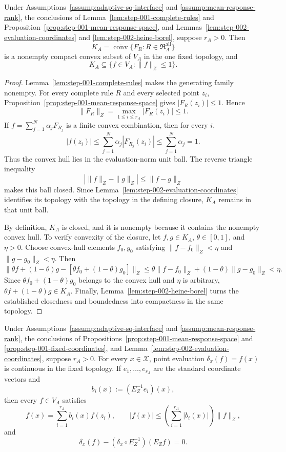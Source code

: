 \begin{proposition}
\label{prop:step-002-compact-body}
Under Assumptions~\ref{assump:adaptive-sq-interface} and
\ref{assump:mean-response-rank}, the conclusions of
Lemma~\ref{lem:step-001-complete-rules} and
Proposition~\ref{prop:step-001-mean-response-space}, and
Lemmas~\ref{lem:step-002-evaluation-coordinates} and
\ref{lem:step-002-heine-borel}, suppose \(r_A>0\).  Then
\[
K_A=\overline{\operatorname{conv}}
\{F_R:R\in\mathfrak R_A^{\mathrm{all}}\}
\]
is a nonempty compact convex subset of \(V_A\) in the one fixed topology, and
\[
K_A\subseteq\{f\in V_A:\|f\|_Z\le1\}.
\]
\end{proposition}

\begin{proof}
Lemma~\ref{lem:step-001-complete-rules} makes the generating family nonempty.
For every complete rule \(R\) and every selected point \(z_i\),
Proposition~\ref{prop:step-001-mean-response-space} gives
\(|F_R(z_i)|\le1\).  Hence
\[
\|F_R\|_Z=\max_{1\le i\le r_A}|F_R(z_i)|\le1.
\]
If \(f=\sum_{j=1}^N\alpha_jF_{R_j}\) is a finite convex combination, then
for every \(i\),
\[
|f(z_i)|
\le\sum_{j=1}^N\alpha_j|F_{R_j}(z_i)|
\le\sum_{j=1}^N\alpha_j=1.
\]
Thus the convex hull lies in the evaluation-norm unit ball.  The reverse
triangle inequality
\[
|\|f\|_Z-\|g\|_Z|\le\|f-g\|_Z
\]
makes this ball closed.  Since
Lemma~\ref{lem:step-002-evaluation-coordinates} identifies its topology with
the topology in the defining closure, \(K_A\) remains in that unit ball.

By definition, \(K_A\) is closed, and it is nonempty because it contains the
nonempty convex hull.  To verify convexity of the closure, let
\(f,g\in K_A\), \(\theta\in[0,1]\), and \(\eta>0\).  Choose convex-hull
elements \(f_0,g_0\) satisfying
\(\|f-f_0\|_Z<\eta\) and \(\|g-g_0\|_Z<\eta\).  Then
\[
\|\theta f+(1-\theta)g-[\theta f_0+(1-\theta)g_0]\|_Z
\le\theta\|f-f_0\|_Z+(1-\theta)\|g-g_0\|_Z
<\eta.
\]
Since \(\theta f_0+(1-\theta)g_0\) belongs to the convex hull and
\(\eta\) is arbitrary, \(\theta f+(1-\theta)g\in K_A\).  Finally,
Lemma~\ref{lem:step-002-heine-borel} turns the established closedness and
boundedness into compactness in the same topology.
\end{proof}

\begin{lemma}
\label{lem:step-002-continuous-evaluations}
Under Assumptions~\ref{assump:adaptive-sq-interface} and
\ref{assump:mean-response-rank}, the conclusions of
Propositions~\ref{prop:step-001-mean-response-space} and
\ref{prop:step-001-fixed-coordinates}, and
Lemma~\ref{lem:step-002-evaluation-coordinates}, suppose \(r_A>0\).  For
every \(x\in\mathcal X\), point evaluation \(\delta_x(f)=f(x)\) is
continuous in the fixed topology.  If \(e_1,\ldots,e_{r_A}\) are the
standard coordinate vectors and
\[
b_i(x):=(E_Z^{-1}e_i)(x),
\]
then every \(f\in V_A\) satisfies
\[
f(x)=\sum_{i=1}^{r_A}b_i(x)f(z_i),
\qquad
|f(x)|\le\left(\sum_{i=1}^{r_A}|b_i(x)|\right)\|f\|_Z,
\]
and
\[
\delta_x(f)-(\delta_x\circ E_Z^{-1})(E_Zf)=0.
\]
\end{lemma}

